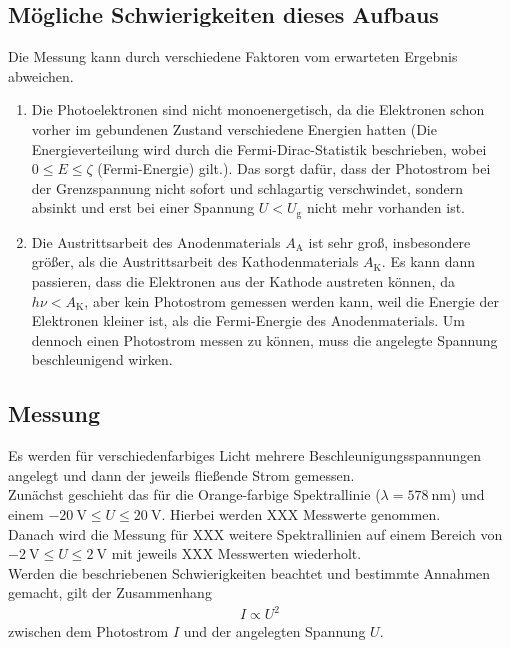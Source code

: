 \subsection{Mögliche Schwierigkeiten dieses Aufbaus}
Die Messung kann durch verschiedene Faktoren vom erwarteten Ergebnis abweichen.
\begin{enumerate}
	\item Die Photoelektronen sind nicht monoenergetisch, da die Elektronen schon vorher im gebundenen Zustand verschiedene Energien hatten (Die Energieverteilung wird durch die Fermi-Dirac-Statistik beschrieben, wobei $0\leq E\leq\zeta$ (Fermi-Energie) gilt.). Das sorgt dafür, dass der Photostrom bei der Grenzspannung nicht sofort und schlagartig verschwindet, sondern absinkt und erst bei einer Spannung $U<U_\text{g}$ nicht mehr vorhanden ist.
	\item Die Austrittsarbeit des Anodenmaterials $A_\text{A}$ ist sehr groß, insbesondere größer, als die Austrittsarbeit des Kathodenmaterials $A_\text{K}$. Es kann dann passieren, dass die Elektronen aus der Kathode austreten können, da $h\nu<A_\text{K}$, aber kein Photostrom gemessen werden kann, weil die Energie der Elektronen kleiner ist, als die Fermi-Energie des Anodenmaterials. Um dennoch einen Photostrom messen zu können, muss die angelegte Spannung beschleunigend wirken.
\end{enumerate}
\subsection{Messung}
Es werden für verschiedenfarbiges Licht mehrere Beschleunigungsspannungen angelegt und dann der jeweils fließende Strom gemessen. \\
Zunächst geschieht das für die Orange-farbige Spektrallinie ($\lambda = \SI{578}{\nano\meter}$) und einem $\SI{-20}{\volt}\leq U \leq\SI{+20}{\volt}$. Hierbei werden XXX Messwerte genommen. \\
Danach wird die Messung für XXX weitere Spektrallinien auf einem Bereich von $\SI{-2}{\volt}\leq U \leq\SI{+2}{\volt}$ mit jeweils XXX Messwerten wiederholt. \\
Werden die beschriebenen Schwierigkeiten beachtet und bestimmte Annahmen gemacht, gilt der Zusammenhang
\begin{align}
	I \propto U^2
\end{align}
zwischen dem Photostrom $I$ und der angelegten Spannung $U$.